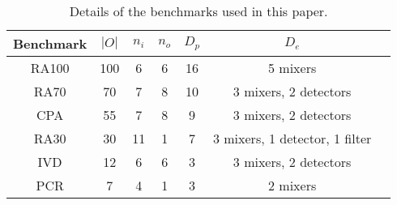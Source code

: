 \begin{table}[t]\small
    \centering
    \caption{Details of the benchmarks used in this paper.}
      \begin{tabular}{|c|c|c|c|c|c|l|}\hline

      Benchmark     & $|O|$ & $n_i$    & $n_o$    & $D_p$     &$D_e$ \\\hline\hline
      RA100         & 100   & 6	       & 6	      &16	           &5 mixers       \\\hline
      RA70          & 70    & 7    & 8  & 10      &3 mixers, 2 detectors       \\\hline
      CPA           & 55    & 7    & 8  & 9       &3 mixers, 2 detectors  \\\hline
      RA30          & 30    & 11     & 1   & 7   & 3 mixers, 1 detector, 1 filter  \\\hline
      IVD           & 12    & 6     & 6   & 3    & 3 mixers, 2 detectors \\\hline
      PCR           & 7     & 4     & 1   & 3    & 2 mixers\\\hline
      \end{tabular}%
    \label{tb_input_graph}%
  \end{table}%
